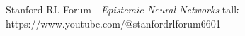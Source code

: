 \documentclass[preview]{standalone}
\begin{document}
Stanford RL Forum - \textit{Epistemic Neural Networks} talk https://www.youtube.com/@stanfordrlforum6601\\
\end{document}
